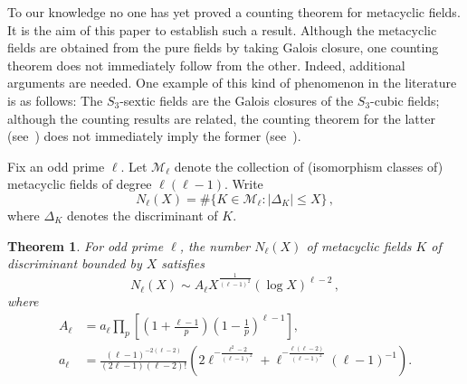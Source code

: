 \documentclass[12pt]{amsart}
\newtheorem{theorem}{Theorem}
\begin{document}
To our knowledge no one has yet proved a counting theorem for metacyclic fields.
It is the aim of this paper to establish such a result.
Although the metacyclic fields are obtained from the pure fields by taking Galois closure,
one counting theorem does not immediately follow from the other.
Indeed, additional arguments are needed.
One example of this kind of phenomenon in the literature is as follows:  The $S_3$-sextic
fields are the
Galois closures of the $S_3$-cubic fields;
although the counting results are related, the counting theorem for
the latter (see~\cite{DH, BST, TT}) does not immediately imply the former (see~\cite{BW}).

Fix an odd prime $\ell$.
Let
$\mathcal{M}_\ell$ denote the collection of
(isomorphism classes of)
metacyclic fields of degree $\ell(\ell-1)$.
Write
$$
  N_\ell(X)=\#\{K\in\mathcal{M}_\ell: |\Delta_K|\leq X\}
  \,,
$$
where $\Delta_K$ denotes the discriminant of $K$.

\begin{theorem}\label{T:main}
For odd prime $\ell$, the number $N_\ell(X)$ of metacyclic fields $K$ of discriminant bounded by $X$
satisfies
$$
  N_\ell(X)\sim A_\ell X^{\frac{1}{(\ell-1)^2}}(\log X)^{\ell-2}
  \,,
$$
where
\begin{align*}
    A_\ell
    &=
    a_\ell\prod_{p} \left[ \left( 1 + \frac{\ell-1}{p} \right)\left( 1 - \frac{1}{p} \right)^{\ell-1} \right],
    \\
a_\ell
&=
\frac{(\ell-1)^{-2(\ell-2)}}{(2\ell-1)(\ell-2)!}\left(2\ell^{-\frac{\ell^2-2}{(\ell-1)^2}}+\ell^{-\frac{\ell(\ell-2)}{(\ell-1)^2}}(\ell-1)^{-1}\right).    
\end{align*}
\end{theorem}
\end{document}

